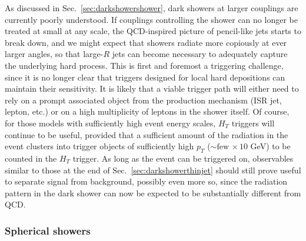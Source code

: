 As discussed in Sec.~\ref{sec:darkshowershower}, dark showers at larger couplings are currently poorly understood. If couplings controlling the shower can no longer be treated at small at any scale, the QCD-inspired picture of pencil-like jets starts to break down, and we might expect that showers radiate more copiously at ever larger angles, so that large-$R$ jets can become necessary to adequately capture the underlying hard process. This is first and foremost a triggering challenge, since it is no longer clear that triggers designed for local hard depositions can maintain their sensitivity. It is likely that a viable trigger path will either need to rely on a prompt associated object from the production mechanism (ISR jet, lepton, etc.) or on a high multiplicity of leptons in the shower itself. Of course, for those models with sufficiently high event energy scales, $H_T$ triggers will continue to be useful, provided that a sufficient amount of the radiation in the event clusters into trigger objects of sufficiently high $p_T$ ($\sim\mathrm{few \,}\times 10$ GeV) to be counted in the $H_T$ trigger. As long as the event can be triggered on, observables similar to those at the end of Sec.~\ref{sec:darkshowerthinjet} should still prove useful to separate signal from background, possibly even more so, since the radiation pattern in the dark shower can now be expected to be substantially different from QCD. 


\subsubsection{Spherical showers} %

